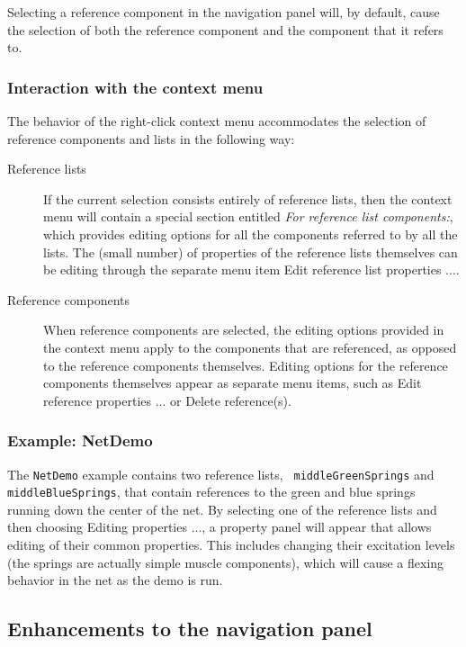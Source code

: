 \documentclass{article}
\begin{document}
Selecting a reference component in the navigation panel will, by
default, cause the selection of both the reference component and the
component that it refers to.

\subsubsection*{Interaction with the context menu}

The behavior of the right-click context menu accommodates the
selection of reference components and lists in the following way:

\begin{description}

\item[Reference lists] If the current selection consists entirely of
reference lists, then the context menu will contain a special section
entitled {\it For reference list components:}, which provides editing
options for all the components referred to by all the lists. The
(small number) of properties of the reference lists themselves can be
editing through the separate menu item {\sf Edit reference list
properties ...}.

\item[Reference components] When reference components are selected,
the editing options provided in the context menu apply to the
components that are referenced, as opposed to the reference components
themselves. Editing options for the reference components themselves
appear as separate menu items, such as {\sf Edit reference properties
...} or {\sf Delete reference(s)}.

\end{description}

\subsubsection*{Example: NetDemo}

The {\tt NetDemo} example contains two reference lists, {\tt
middleGreenSprings} and {\tt middleBlueSprings}, that contain
references to the green and blue springs running down the center of
the net. By selecting one of the reference lists and then choosing
{\sf Editing properties ...}, a property panel will appear that allows
editing of their common properties.  This includes changing their
excitation levels (the springs are actually simple muscle components),
which will cause a flexing behavior in the net as the demo is run.

\subsection*{Enhancements to the navigation panel}
\end{document}
